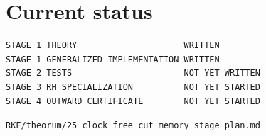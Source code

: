 \hypertarget{current-status}{%
\section{Current status}\label{current-status}}

\begin{verbatim}
STAGE 1 THEORY                     WRITTEN
STAGE 1 GENERALIZED IMPLEMENTATION WRITTEN
STAGE 2 TESTS                      NOT YET WRITTEN
STAGE 3 RH SPECIALIZATION          NOT YET STARTED
STAGE 4 OUTWARD CERTIFICATE        NOT YET STARTED
\end{verbatim}

\begin{flushright}\small\texttt{RKF/theorum/25\_clock\_free\_cut\_memory\_stage\_plan.md}\end{flushright}
